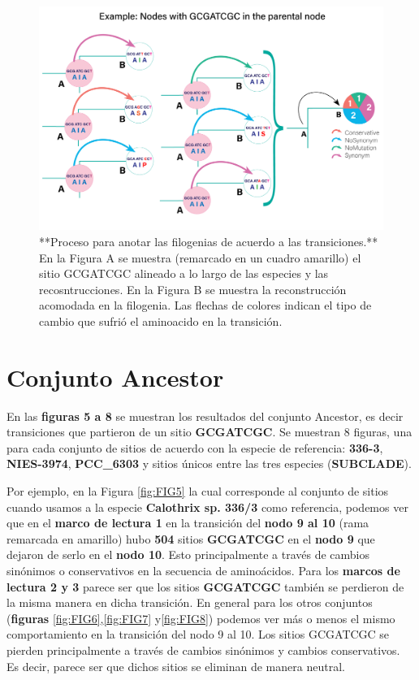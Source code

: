 \documentclass[
]{book}
\begin{document}
\begin{figure}

{\centering \includegraphics[width=1\linewidth]{Clados/Calothrix_B/figures/transition example} 

}

\caption{**Proceso para anotar las filogenias de acuerdo a las transiciones.** En la Figura A se muestra (remarcado en un cuadro amarillo) el sitio GCGATCGC alineado a lo largo de las especies y las recosntrucciones. En la Figura B se muestra la reconstrucción acomodada en la filogenia. Las flechas de colores indican el tipo de cambio que sufrió el aminoacido en la transición.}\label{fig:EXA}
\end{figure}

\hypertarget{conjunto-ancestor}{%
\section{Conjunto Ancestor}\label{conjunto-ancestor}}

En las \textbf{figuras 5 a 8} se muestran los resultados del conjunto Ancestor, es decir transiciones que partieron de un sitio \textbf{GCGATCGC}. Se muestran 8 figuras, una para cada conjunto de sitios de acuerdo con la especie de referencia: \textbf{336-3}, \textbf{NIES-3974}, \textbf{PCC\_6303} y sitios únicos entre las tres especies (\textbf{SUBCLADE}).

Por ejemplo, en la Figura \ref{fig:FIG5} la cual corresponde al conjunto de sitios cuando usamos a la especie \textbf{Calothrix sp. 336/3} como referencia, podemos ver que en el \textbf{marco de lectura 1} en la transición del \textbf{nodo 9 al 10} (rama remarcada en amarillo) hubo \textbf{504} sitios \textbf{GCGATCGC} en el \textbf{nodo 9} que dejaron de serlo en el \textbf{nodo 10}. Esto principalmente a través de cambios sinónimos o conservativos en la secuencia de aminoácidos. Para los \textbf{marcos de lectura 2 y 3} parece ser que los sitios \textbf{GCGATCGC} también se perdieron de la misma manera en dicha transición. En general para los otros conjuntos (\textbf{figuras} \ref{fig:FIG6},\ref{fig:FIG7} y\ref{fig:FIG8}) podemos ver más o menos el mismo comportamiento en la transición del nodo 9 al 10. Los sitios GCGATCGC se pierden principalmente a través de cambios sinónimos y cambios conservativos. Es decir, parece ser que dichos sitios se eliminan de manera neutral.
\end{document}
